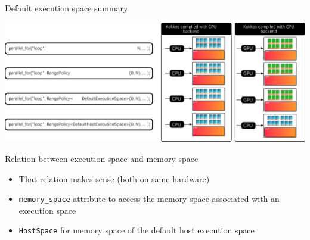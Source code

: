 \documentclass[
    aspectratio=169,
]{beamer}
\begin{document}

\begin{frame}{Default execution space summary}
    \begin{center}
        \includegraphics[width=\textwidth]{default_execution_space.png}
    \end{center}
\end{frame}


\begin{frame}[fragile]{Relation between execution space and memory space}
    \begin{itemize}
        \item That relation makes sense (both on same hardware)
        \item \texttt{memory\_space} attribute to access the memory space associated with an execution space
        \item \texttt{HostSpace} for memory space of the default host execution space
    \end{itemize}
    \pause
    \begin{center}
    \end{center}
\end{frame}
\end{document}
